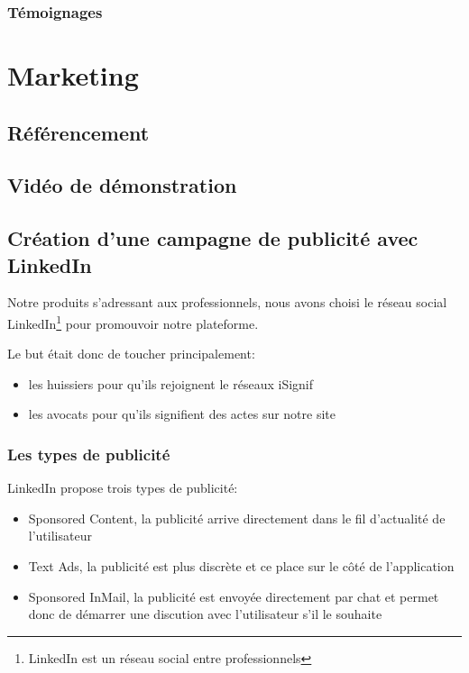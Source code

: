 \documentclass[]{report}
\begin{document}
    \subsection{Témoignages}

\chapter{Marketing}

  \section{Référencement}

  \section{Vidéo de démonstration}

  \section{Création d'une campagne de publicité avec LinkedIn}

    Notre produits s’adressant aux professionnels, nous avons choisi le réseau social LinkedIn\footnote{LinkedIn est un réseau social entre professionnels} pour promouvoir notre plateforme.

    Le but était donc de toucher principalement:

    \begin{itemize}
        \item les huissiers pour qu'ils rejoignent le réseaux iSignif
        \item les avocats pour qu'ils signifient des actes sur notre site
    \end{itemize}

    \subsection{Les types de publicité}

      LinkedIn propose trois types de publicité:

      \begin{itemize}
        \item Sponsored Content, la publicité arrive directement dans le fil d'actualité de l'utilisateur
        \item Text Ads, la publicité est plus discrète et ce place sur le côté de l'application
        \item Sponsored InMail, la publicité est envoyée directement par chat et permet donc de démarrer une discution avec l'utilisateur s'il le souhaite
      \end{itemize}
\end{document}
